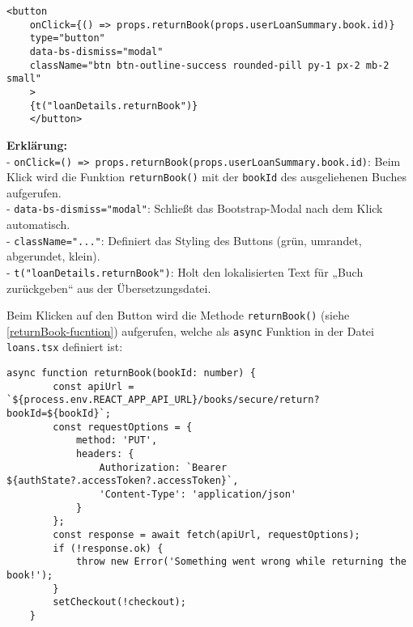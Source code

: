 \begin{lstlisting}[style=pseudocode, caption=retrurnBook-Button in LoanDetailsModal.tsx, label=retrurnBook-Button]
	<button
	onClick={() => props.returnBook(props.userLoanSummary.book.id)}
	type="button"
	data-bs-dismiss="modal"
	className="btn btn-outline-success rounded-pill py-1 px-2 mb-2 small"
	>
	{t("loanDetails.returnBook")}
	</button>
\end{lstlisting}

\noindent \textbf{Erklärung:} \\
- \texttt{onClick={() => props.returnBook(props.userLoanSummary.book.id)}}: Beim Klick wird die Funktion \texttt{returnBook()} mit der \texttt{bookId} des ausgeliehenen Buches aufgerufen.\\
- \texttt{data-bs-dismiss="modal"}: Schließt das Bootstrap-Modal nach dem Klick automatisch.\\
- \texttt{className="..."}: Definiert das Styling des Buttons (grün, umrandet, abgerundet, klein).\\
- \texttt{{t("loanDetails.returnBook")}}: Holt den lokalisierten Text für „Buch zurückgeben“ aus der Übersetzungsdatei.

\noindent Beim Klicken auf den Button wird die Methode \texttt{returnBook()} (siehe \ref{returnBook-fucntion}) aufgerufen, welche als \texttt{async} Funktion in der Datei \texttt{loans.tsx} definiert ist:


\begin{lstlisting}[style=pseudocode, caption=returnBook() in Loans.tsx, label=returnBook-fucntion, breaklines=true]
	async function returnBook(bookId: number) {
		const apiUrl = `${process.env.REACT_APP_API_URL}/books/secure/return?bookId=${bookId}`;
		const requestOptions = {
			method: 'PUT',
			headers: {
				Authorization: `Bearer ${authState?.accessToken?.accessToken}`,
				'Content-Type': 'application/json'
			}
		};
		const response = await fetch(apiUrl, requestOptions);
		if (!response.ok) {
			throw new Error('Something went wrong while returning the book!');
		}
		setCheckout(!checkout);
	}
\end{lstlisting}

